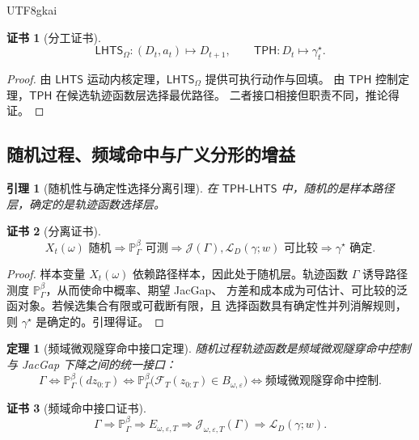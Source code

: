 \documentclass[12pt]{article}
\newtheorem{theorem}{定理}[section]
\newtheorem{lemma}{引理}[section]
\newtheorem{Certificate}{证书}[section]
\newcommand{\LHTS}{\ensuremath{\mathsf{LHTS}}}
\newcommand{\TPH}{\ensuremath{\mathsf{TPH}}}
\newcommand{\TPHLHTS}{\ensuremath{\mathsf{TPH\mbox{-}LHTS}}}
\newcommand{\Prob}{\mathbb P}
\begin{document}
\begin{CJK*}{UTF8}{gkai}
\begin{Certificate}[分工证书]
\[
\boxed{
\LHTS_\Omega:
(D_t,a_t)\mapsto D_{t+1},
\qquad
\TPH:
D_t\mapsto\gamma_t^\star.
}
\]
\end{Certificate}

\begin{proof}
由 \(\LHTS\) 运动内核定理，\(\LHTS_\Omega\) 提供可执行动作与回填。
由 \(\TPH\) 控制定理，\(\TPH\) 在候选轨迹函数层选择最优路径。
二者接口相接但职责不同，推论得证。
\end{proof}

\subsection{随机过程、频域命中与广义分形的增益}
\label{subsec:random-frequency-fractal-gain}

\begin{lemma}[随机性与确定性选择分离引理]
在 \(\TPHLHTS\) 中，随机的是样本路径层，确定的是轨迹函数选择层。
\end{lemma}

\begin{Certificate}[分离证书]
\[
\boxed{
X_t(\omega)\text{ 随机}
\Rightarrow
\mathbb P_\Gamma^\beta\text{ 可测}
\Rightarrow
\mathcal J(\Gamma),\mathcal L_D(\gamma;w)\text{ 可比较}
\Rightarrow
\gamma^\star\text{ 确定}.
}
\]
\end{Certificate}

\begin{proof}
样本变量 \(X_t(\omega)\) 依赖路径样本，因此处于随机层。轨迹函数 \(\Gamma\)
诱导路径测度 \(\mathbb P_\Gamma^\beta\)，从而使命中概率、期望 JacGap、
方差和成本成为可估计、可比较的泛函对象。若候选集合有限或可截断有限，且
选择函数具有确定性并列消解规则，则 \(\gamma^\star\) 是确定的。引理得证。
\end{proof}

\begin{theorem}[频域微观隧穿命中接口定理]
随机过程轨迹函数是频域微观隧穿命中控制与 JacGap 下降之间的统一接口：
\[
\boxed{
\Gamma
\Longleftrightarrow
\mathbb P_\Gamma^\beta(dz_{0:T})
\Longleftrightarrow
\Prob_\Gamma^\beta
\bigl(
\mathscr F_T(z_{0:T})\in B_{\omega,\varepsilon}
\bigr)
\Longleftrightarrow
\text{频域微观隧穿命中控制}.
}
\]
\end{theorem}

\begin{Certificate}[频域命中接口证书]
\[
\boxed{
\Gamma
\Rightarrow
\mathbb P_\Gamma^\beta
\Rightarrow
E_{\omega,\varepsilon,T}
\Rightarrow
\mathcal J_{\omega,\varepsilon,T}(\Gamma)
\Rightarrow
\mathcal L_D(\gamma;w).
}
\]
\end{Certificate}


\end{CJK*}
\end{document}
